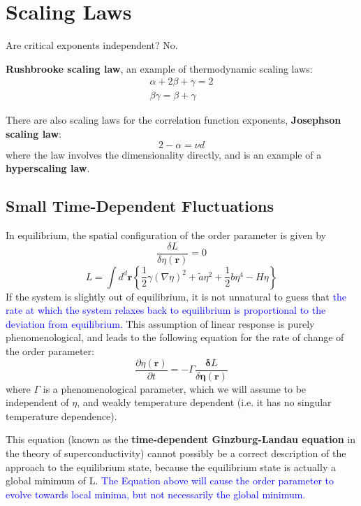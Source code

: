 \documentclass[12pt,titlepage]{article}
\newcommand{\bluep}[1]{\textcolor{blue}{#1}}
\numberwithin{equation}{section}
\begin{document}
\section{Scaling Laws}
Are critical exponents independent? No.

\textbf{Rushbrooke scaling law}, an example of thermodynamic scaling laws:
\begin{equation}
\begin{array}{c}{\alpha+2 \beta+\gamma=2} \\ {\beta \gamma=\beta+\gamma}\end{array}
\end{equation}

There are also scaling laws for the correlation function exponents, \textbf{Josephson scaling law}:
\begin{equation}
2-\alpha=\nu d
\end{equation}
where the law involves the dimensionality directly, and is an example of a \textbf{hyperscaling law}.

\subsection{Small Time-Dependent Fluctuations}
In equilibrium, the spatial configuration of the order parameter is given by
\begin{equation}
\frac{\delta L}{\delta \eta(\mathbf{r})}=0
\end{equation}
\begin{equation}
L=\int d^{d} \mathbf{r}\left\{\frac{1}{2} \gamma(\nabla \eta)^{2}+\tilde{a} \eta^{2}+\frac{1}{2} b \eta^{4}-H \eta\right\}
\end{equation}
If the system is slightly out of equilibrium, it is not unnatural to guess that \bluep{the rate at which the system relaxes back to equilibrium is proportional to the deviation from equilibrium.} This assumption of linear response is purely phenomenological, and leads to the following equation for the rate of change of the order parameter:
\begin{equation}
\frac{\partial \eta(\mathbf{r})}{\partial t}=-\Gamma \frac{\boldsymbol{\delta} L}{\delta \boldsymbol{\eta}(\mathbf{r})}
\end{equation}
where $\Gamma$ is a phenomenological parameter, which we will assume to be independent of $\eta$, and weakly temperature dependent (i.e. it has no singular temperature dependence).

This equation (known as the \textbf{time-dependent Ginzburg-Landau equation} in the theory of superconductivity) cannot possibly be a correct description of the approach to the equilibrium state, because the equilibrium state is actually a global minimum of L. \bluep{The Equation above will cause the order parameter to evolve towards local minima, but not necessarily the global minimum.}
\end{document}
